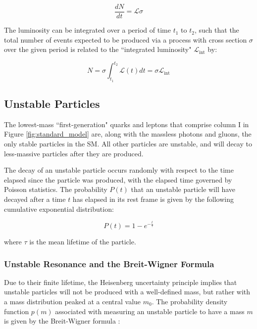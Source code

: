 \begin{equation}
\frac{dN}{dt} = \mathcal{L}\sigma
\end{equation}

The luminosity can be integrated over a period of time \(t_1\) to \(t_2\), such that the total number of events expected to be produced via a process with cross section \(\sigma\) over the given period is related to the ``integrated luminosity" \(\mathcal{L}_\text{int}\) by:

\begin{equation}
\label{eq:integrated_lumi}
N = \sigma\int_{t_1}^{t_2}\mathcal{L}(t)dt = \sigma\mathcal{L}_\text{int}
\end{equation}

\subsection{Unstable Particles}

The lowest-mass ``first-generation" quarks and leptons that comprise column I in Figure \ref{fig:standard_model} are, along with the massless photons and gluons, the only stable particles in the SM. All other particles are unstable, and will decay to less-massive particles after they are produced. 

The decay of an unstable particle occurs randomly with respect to the time elapsed since the particle was produced, with the elapsed time governed by Poisson statistics. The probability \(P(t)\) that an unstable particle will have decayed after a time \(t\) has elapsed in its rest frame is given by the following cumulative exponential distribution:

\begin{equation}
\label{eq:particle_decay}
P(t) = 1-e^{-\frac{t}{\tau}} %
\end{equation}

\noindent where \(\tau\) is the mean lifetime of the particle.


\subsubsection{Unstable Resonance and the Breit-Wigner Formula}

Due to their finite lifetime, the Heisenberg uncertainty principle implies that unstable particles will not be produced with a well-defined mass, but rather with a mass distribution peaked at a central value \(m_0\). The probability density function \(p(m)\) associated with measuring an unstable particle to have a mass \(m\) is given by the Breit-Wigner formula \cite{breit_wigner}:

